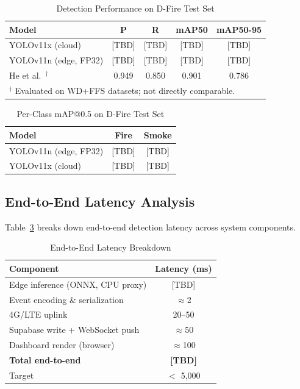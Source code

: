 \documentclass[conference]{IEEEtran}
\begin{document}
\begin{table}[h]
\caption{Detection Performance on D-Fire Test Set}
\label{tab:detection}
\centering
\begin{tabular}{lcccc}
\toprule
\textbf{Model} & \textbf{P} & \textbf{R} & \textbf{mAP50} & \textbf{mAP50-95} \\
\midrule
YOLOv11x (cloud)      & [TBD] & [TBD] & [TBD] & [TBD] \\
YOLOv11n (edge, FP32) & [TBD] & [TBD] & [TBD] & [TBD] \\
\midrule
He et al.~\cite{he2025yolov11}$^\dagger$ & 0.949 & 0.850 & 0.901 & 0.786 \\
\bottomrule
\multicolumn{5}{l}{\scriptsize $^\dagger$ Evaluated on WD+FFS datasets; not directly comparable.}
\end{tabular}
\end{table}

\begin{table}[h]
\caption{Per-Class mAP@0.5 on D-Fire Test Set}
\label{tab:perclass}
\centering
\begin{tabular}{lcc}
\toprule
\textbf{Model} & \textbf{Fire} & \textbf{Smoke} \\
\midrule
YOLOv11n (edge, FP32) & [TBD] & [TBD] \\
YOLOv11x (cloud)      & [TBD] & [TBD] \\
\bottomrule
\end{tabular}
\end{table}

\subsection{End-to-End Latency Analysis}

Table~\ref{tab:latency} breaks down end-to-end detection latency across
system components.

\begin{table}[h]
\caption{End-to-End Latency Breakdown}
\label{tab:latency}
\centering
\begin{tabular}{lc}
\toprule
\textbf{Component} & \textbf{Latency (ms)} \\
\midrule
Edge inference (ONNX, CPU proxy) & [TBD] \\
Event encoding \& serialization  & $\approx$2 \\
4G/LTE uplink                    & 20--50 \\
Supabase write + WebSocket push  & $\approx$50 \\
Dashboard render (browser)       & $\approx$100 \\
\midrule
\textbf{Total end-to-end}        & \textbf{[TBD]} \\
\midrule
Target                           & $<$ 5{,}000 \\
\bottomrule
\end{tabular}
\end{table}
\end{document}
